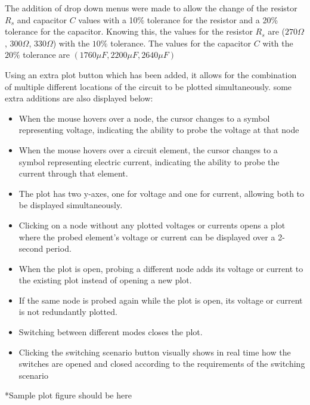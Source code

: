 The addition of drop down menus were made to allow the change of the resistor $R_s$ and capacitor $C$ values with  a 10\% tolerance for the resistor and a 20\% tolerance for the capacitor. Knowing this, the values for the resistor $R_s$ are ($270\Omega$, $300\Omega$, $330\Omega$) with the $10\%$ tolerance. The values for the capacitor $C$ with the $20\%$ tolerance are $(1760\mu F, 2200\mu F, 2640\mu F)$ 

Using an extra plot button which has been added, it allows for the combination of multiple different locations of the circuit to be plotted simultaneously. some extra additions are also displayed below: 

\begin{itemize}
    \item When the mouse hovers over a node, the cursor changes to a symbol representing voltage, indicating the ability to probe the voltage at that node

    \item When the mouse hovers over a circuit element, the cursor changes to a symbol representing electric current, indicating the ability to probe the current through that element.

    \item The plot has two y-axes, one for voltage and one for current, allowing both to be displayed simultaneously.

    \item Clicking on a node without any plotted voltages or currents opens a plot where the probed element's voltage or current can be displayed over a 2-second period.

    \item When the plot is open, probing a different node adds its voltage or current to the existing plot instead of opening a new plot.

    \item If the same node is probed again while the plot is open, its voltage or current is not redundantly plotted.

    \item Switching between different modes closes the plot.

    \item Clicking the switching scenario button visually shows in real time how the switches are opened and closed according to the requirements of the switching scenario
\end{itemize}

*Sample plot figure should be here

